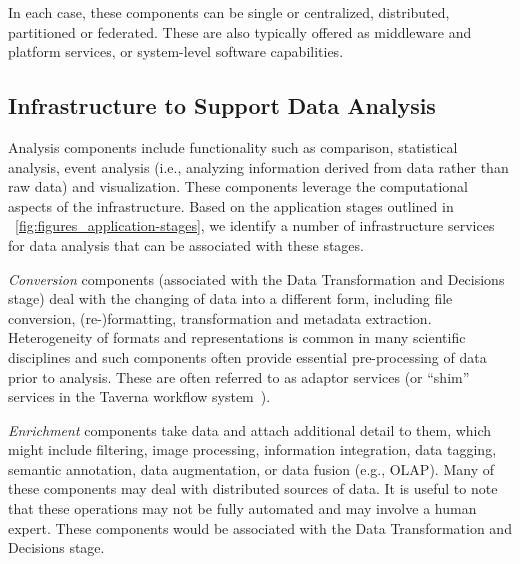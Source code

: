In each case, these components can be single or centralized,
distributed, partitioned or federated. These are also typically
offered as middleware and platform services, or system-level software
capabilities.


\subsection{Infrastructure to Support Data Analysis}
\label{sec:infra_analysis}



Analysis components include functionality such as comparison,
statistical analysis, event analysis (i.e., analyzing information
derived from data rather than raw data) and visualization. These components leverage
the computational aspects of the infrastructure.
Based on the application stages outlined in
\figurename~\ref{fig:figures_application-stages}, we identify a number
of infrastructure services for data analysis that can be associated with these stages.

{\em Conversion} components (associated with the Data Transformation
and Decisions stage) deal with the changing of data into a different
form, including file conversion, (re-)formatting, transformation and
metadata extraction. Heterogeneity of formats and representations is
common in many scientific disciplines and such components often
provide essential pre-processing of data prior to analysis. These are often
referred to as adaptor services (or ``shim'' services in the Taverna workflow system~\cite{Taverna}).

{\em Enrichment} components take data and attach additional detail to
them, which might include filtering, image processing, information
integration, data tagging, semantic annotation, data augmentation, or
data fusion (e.g., OLAP). Many of these components may deal with
distributed sources of data. It is useful to note that these
operations may not be fully automated and may involve a human
expert. These components would be associated with the Data
Transformation and Decisions stage.

